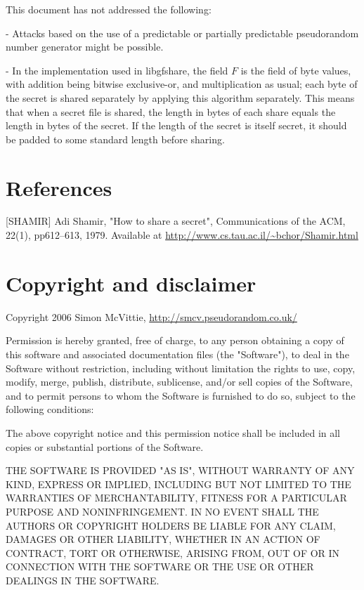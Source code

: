 \documentclass[]{article}
\begin{document}
This document has not addressed the following:

- Attacks based on the use of a predictable or partially predictable
  pseudorandom number generator might be possible.

- In the implementation used in libgfshare, the field $F$ is the field
  of byte values, with addition being bitwise exclusive-or, and multiplication
  as usual; each byte of the secret is shared separately by applying this
  algorithm separately. This means that when a secret file is shared,
  the length in bytes of each share equals the length in bytes of the
  secret. If the length of the secret is itself secret, it should be
  padded to some standard length before sharing.

\section{References}

[SHAMIR] Adi Shamir, "How to share a secret", Communications of the ACM, 22(1), pp612--613, 1979. Available at \url{http://www.cs.tau.ac.il/~bchor/Shamir.html}

\section{Copyright and disclaimer}

Copyright 2006 Simon McVittie, \url{http://smcv.pseudorandom.co.uk/}

Permission is hereby granted, free of charge, to any person obtaining a copy
of this software and associated documentation files (the "Software"), to deal
in the Software without restriction, including without limitation the rights
to use, copy, modify, merge, publish, distribute, sublicense, and/or sell
copies of the Software, and to permit persons to whom the Software is
furnished to do so, subject to the following conditions:

The above copyright notice and this permission notice shall be included in
all copies or substantial portions of the Software.

THE SOFTWARE IS PROVIDED "AS IS", WITHOUT WARRANTY OF ANY KIND, EXPRESS OR
IMPLIED, INCLUDING BUT NOT LIMITED TO THE WARRANTIES OF MERCHANTABILITY,
FITNESS FOR A PARTICULAR PURPOSE AND NONINFRINGEMENT.  IN NO EVENT SHALL THE
AUTHORS OR COPYRIGHT HOLDERS BE LIABLE FOR ANY CLAIM, DAMAGES OR OTHER
LIABILITY, WHETHER IN AN ACTION OF CONTRACT, TORT OR OTHERWISE, ARISING FROM,
OUT OF OR IN CONNECTION WITH THE SOFTWARE OR THE USE OR OTHER DEALINGS IN
THE SOFTWARE.
\end{document}
